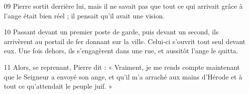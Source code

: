 
09 Pierre sortit derrière lui, mais il ne savait pas que tout ce qui arrivait grâce à l’ange était bien réel ; il pensait qu’il avait une vision.

10 Passant devant un premier poste de garde, puis devant un second, ils arrivèrent au portail de fer donnant sur la ville. Celui-ci s’ouvrit tout seul devant eux. Une fois dehors, ils s’engagèrent dans une rue, et aussitôt l’ange le quitta.

11 Alors, se reprenant, Pierre dit : « Vraiment, je me rends compte maintenant que le Seigneur a envoyé son ange, et qu’il m’a arraché aux mains d’Hérode et à tout ce qu’attendait le peuple juif. »